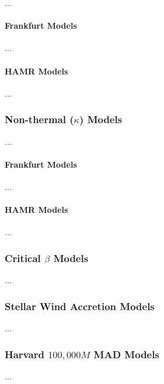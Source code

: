 \documentclass[twocolumn,twocolappendix,tighten,dvipsnames,linenumbers]{aastex63}
\begin{document}
...

\paragraph{Frankfurt Models}

...

\paragraph{HAMR Models}

...

\subsubsection{Non-thermal ($\kappa$) Models}

...

\paragraph{Frankfurt Models}

...

\paragraph{HAMR Models}

...

\subsubsection{Critical $\beta$ Models}

...

\subsubsection{Stellar Wind Accretion Models}

...

\subsubsection{Harvard $100,000M$ MAD Models}

...
\end{document}
